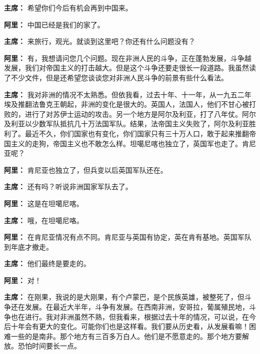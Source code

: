 \begin{list}{}
\item[\textbf{主席：}] 希望你们今后有机会再到中国来。

\item[\textbf{阿里：}] 中国已经是我们的家了。

\item[\textbf{主席：}] 来旅行，观光。就谈到这里吧？你还有什么问题没有？

\item[\textbf{阿里：}] 有，我想请问您几个问题。现在非洲人民的斗争，正在蓬勃发展，斗争越发展，我们对帝国主义的打击越大。但是这个斗争还要走很长一段道路。我虽然读了不少文件，但是还希望您谈谈您对非洲人民斗争的前景有些什么看法。

\item[\textbf{主席：}] 我对非洲的情况不太熟悉。但依我看，过去十年、十一年，从一九五二年埃及推翻法鲁克王朝起，非洲的变化是很大的。英国人，法国人，他们不甘心被打败的，进行了对苏伊士运动的攻击。另一个地方是阿尔及利亚，打了八年仗。阿尔及利亚以少数军队抵抗几十万法国军队。结果，法帝国主义失败了，阿尔及利亚胜利了。最近不久，你们国家也有变化，你们国家只有三十万人口，敢于起来推翻帝国主义的走狗，帝国主义也不敢怎么样。坦噶尼喀也独立了，英国军也走了。肯尼亚呢？

\item[\textbf{阿里：}] 肯尼亚也独立了，但兵变以后英国军队还在。

\item[\textbf{主席：}] 还有吗？听说非洲国家军队去了。

\item[\textbf{阿里：}] 这是在坦噶尼喀。

\item[\textbf{主席：}] 哦，在坦噶尼咯。

\item[\textbf{阿里：}] 在肯尼亚情况有点不同。肯尼亚与英国有协定，英在肯有基地。英国军队到年底才撤走。

\item[\textbf{主席：}] 他们最终是要走的。

\item[\textbf{阿里：}] 对！

\item[\textbf{主席：}] 在刚果，我说的是大刚果，有个卢蒙巴，是个民族英雄，被整死了，但斗争还在发展。在最近大半年，斗争有发展。在西南非洲，安哥拉，葡属殖民地，斗争也在进行。我对非洲虽然不熟，但我看来，根据过去十年的情况，可以说，在今后十年会有更大的变化。可能你们也是这样看。我们要从历史看，从发展看嘛！困难一些的是南非。那个地方有三百多万白人。他们是不愿意走的。那个地方要解放。恐怕时间要长一点。


\end{list}
